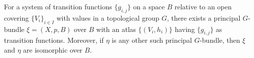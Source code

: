 For a system of transition functions $\{g_{i,j}\}$ on a space $B$ relative to an open covering $\{V_i\}_{i \in I}$ with values in a topological group $G$, there exists a principal $G$-bundle $\xi = (X, p, B)$ over $B$ with an atlas $\{(V_i, h_i)\}$ having $\{g_{i,j}\}$ as transition functions. Moreover, if $\eta$ is any other such principal $G$-bundle, then $\xi$ and $\eta$ are isomorphic over $B$.
